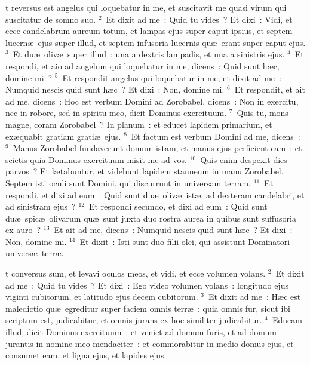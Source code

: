 \bchapter
{}t reversus est angelus qui loquebatur in me, et suscitavit me quasi virum qui suscitatur de somno suo.
${}^{2}$~Et dixit ad me~: Quid tu vides~? Et dixi~: Vidi, et ecce candelabrum aureum totum, et lampas ejus super caput ipsius, et septem lucern\ae\ ejus super illud, et septem infusoria lucernis qu\ae\ erant super caput ejus.
${}^{3}$~Et du\ae\ oliv\ae\ super illud~: una a dextris lampadis, et una a sinistris ejus.
${}^{4}$~Et respondi, et aio ad angelum qui loquebatur in me, dicens~: Quid sunt h\ae c, domine mi~?
${}^{5}$~Et respondit angelus qui loquebatur in me, et dixit ad me~: Numquid nescis quid sunt h\ae c~? Et dixi~: Non, domine mi.
${}^{6}$~Et respondit, et ait ad me, dicens~: Hoc est verbum Domini ad Zorobabel, dicens~: Non in exercitu, nec in robore, sed in spiritu meo, dicit Dominus exercituum.
${}^{7}$~Quis tu, mons magne, coram Zorobabel~? In planum~: et educet lapidem primarium, et ex\ae quabit gratiam grati\ae\ ejus.
${}^{8}$~Et factum est verbum Domini ad me, dicens~:
${}^{9}$~Manus Zorobabel fundaverunt domum istam, et manus ejus perficient eam~: et scietis quia Dominus exercituum misit me ad vos.
${}^{10}$~Quis enim despexit dies parvos~? Et l\ae tabuntur, et videbunt lapidem stanneum in manu Zorobabel. Septem isti oculi sunt Domini, qui discurrunt in universam terram.
${}^{11}$~Et respondi, et dixi ad eum~: Quid sunt du\ae\ oliv\ae\ ist\ae , ad dexteram candelabri, et ad sinistram ejus~?
${}^{12}$~Et respondi secundo, et dixi ad eum~: Quid sunt du\ae\ spic\ae\ olivarum qu\ae\ sunt juxta duo rostra aurea in quibus sunt suffusoria ex auro~?
${}^{13}$~Et ait ad me, dicens~: Numquid nescis quid sunt h\ae c~? Et dixi~: Non, domine mi.
${}^{14}$~Et dixit~: Isti sunt duo filii olei, qui assistunt Dominatori univers\ae\ terr\ae .

\bchapter
{}t conversus sum, et levavi oculos meos, et vidi, et ecce volumen volans.
${}^{2}$~Et dixit ad me~: Quid tu vides~? Et dixi~: Ego video volumen volans~: longitudo ejus viginti cubitorum, et latitudo ejus decem cubitorum.
${}^{3}$~Et dixit ad me~: H\ae c est maledictio qu\ae\ egreditur super faciem omnis terr\ae~: quia omnis fur, sicut ibi scriptum est, judicabitur, et omnis jurans ex hoc similiter judicabitur.
${}^{4}$~Educam illud, dicit Dominus exercituum~: et veniet ad domum furis, et ad domum jurantis in nomine meo mendaciter~: et commorabitur in medio domus ejus, et consumet eam, et ligna ejus, et lapides ejus.


